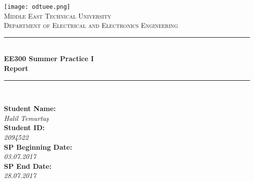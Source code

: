 \begin{titlepage}

\newcommand{\HRule}{\rule{\linewidth}{0.5mm}} %

\center %

\texttt{[image: odtuee.png]}\\[1cm]
 

 

\textsc{\LARGE Middle East Technical University}\\[1.5cm] %
\textsc{\Large Department of Electrical and Electronics Engineering }\\[0.5cm] %


\HRule \\[0.4cm]

{ \huge \bfseries \large EE300 Summer Practice I \\ Report}\\[0cm] %
\HRule \\[1cm]
 

\begin{minipage}{0.35\textwidth}
\begin{flushleft} \large
\textbf{Student Name:} \\
 \textit{Halil Temurtaş} \\
\textbf{Student ID:} \\ 
 \textit{2094522} \\
\textbf{SP Beginning Date:} \\
 \textit{03.07.2017} \\
\textbf{SP End Date:}\\
 \textit{28.07.2017}



\end{flushleft}
\end{minipage}
\end{titlepage}
